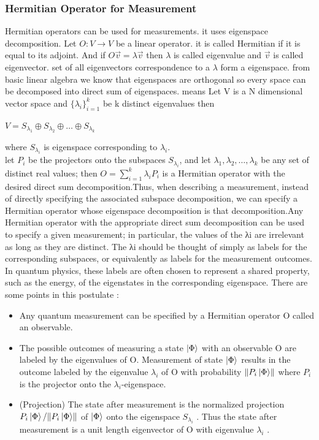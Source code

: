 \documentclass[11 pt]{article}
\theoremstyle{definition}
\theoremstyle{remark}
\newcommand\norm[1]{\left\lVert#1\right\rVert}
\begin{document}
\subsubsection{Hermitian Operator for Measurement}
Hermitian operators can be used for measurements. it uses eigenspace decomposition. Let $O : V \rightarrow V$ be a linear operator. it is called Hermitian if it is equal to its adjoint. And if $O\vec{v}=\lambda\vec{v}$ then $\lambda$ is called eigenvalue and $\vec{v}$ is called eigenvector. set of all eigenvectors correspondence to a $\lambda$ form a eigenspace. from basic linear algebra we know that eigenspaces are orthogonal so every space can be decomposed into direct sum of eigenspaces. means Let V is a N dimensional vector space and $\{\lambda_i\}_{i=1}^{k}$ be k distinct eigenvalues then 
\begin{center}
$V = S_{\lambda_1} \oplus S_{\lambda_2} \oplus \hdots \oplus S_{\lambda_k}$
\end{center}
where $S_{\lambda_i}$ is eigenspace corresponding to $\lambda_i$.\\
let $P_i$ be the projectors onto the subspaces $S_{\lambda_i}$, and let $\lambda_1,\lambda_2,\hdots,\lambda_k$ be any set of distinct real values; then $O = \sum_{i=1}^{k} \lambda_{i}P_i$ is a Hermitian operator with the desired direct sum decomposition.Thus, when describing a measurement, instead of directly specifying the associated subspace decomposition, we can specify a Hermitian operator whose eigenspace decomposition is that decomposition.Any Hermitian operator with the appropriate direct sum decomposition can be used to specify a given measurement; in particular, the values of the λi are irrelevant as long as they are distinct. The λi should be thought of simply as labels for the corresponding subspaces, or equivalently as labels for the measurement outcomes. In quantum physics, these labels are often chosen to represent a shared property, such as the energy, of the eigenstates in the corresponding eigenspace. There are some points in this postulate : 
\begin{itemize}
\item Any quantum measurement can be specified by a Hermitian operator O called an observable.
\item The possible outcomes of measuring a state $\ket{\Phi}$ with an observable O are labeled by the eigenvalues of O. Measurement of state $\ket{\Phi}$ results in the outcome labeled by the eigenvalue $\lambda_i$ of O with probability $\norm{P_{i}\ket{\Phi}}$ where $P_i$ is the projector onto the $\lambda_i$-eigenspace.
\item (Projection) The state after measurement is the normalized projection $P_i\ket{\Phi}/\lVert P_i\ket{\Phi} \rVert$ of $\ket{\Phi}$ onto the eigenspace $S_{\lambda_i}$ . Thus the state after measurement is a unit length eigenvector of O with eigenvalue $\lambda_i$ .
\end{itemize}
\end{document}

